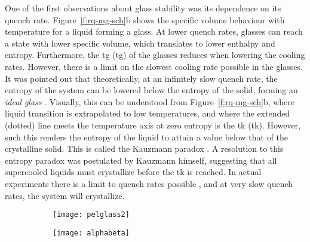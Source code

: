 One of the first observations about glass stability was its dependence on its quench rate. Figure~\ref{f:rq-mg-sch}b shows the specific volume behaviour with temperature for a liquid forming a glass. At lower quench rates, glasses can reach a state with lower specific volume, which translates to lower enthalpy and entropy. Furthermore, the \glsdesc{tg} (\gls{tg}) of the glasses reduces when lowering the cooling rates. However, there is a limit on the slowest cooling rate possible in the glasses. It was pointed out that theoretically, at an infinitely slow quench rate, the entropy of the system can be lowered below the entropy of the solid, forming an \textit{ideal glass} \cite{Kauzmann1948}. Visually, this can be understood from Figure~\ref{f:rq-mg-sch}b, where liquid transition is extrapolated to low temperatures, and where the extended (dotted) line meets the temperature axis at zero entropy is the \glsdesc{tk} (\gls{tk}). However, such this renders the entropy of the liquid to attain a value below that of the crystalline solid. This is called the Kauzmann paradox \cite{Kauzmann1948,Debenedetti2001,Berthier2016}. A resolution to this entropy paradox was postulated by Kauzmann himself, suggesting that all supercooled liquids must crystallize before the \gls{tk} is reached. In actual experiments there is a limit to quench rates possible \cite{Kauzmann1948}, and at very slow quench rates, the system will crystallize. \par

\begin{figure}[!h]
	\begin{subfigure}{0.5\textwidth}
		\texttt{[image: pelglass2]}
		\subcaption{}
	\end{subfigure}%
	\begin{subfigure}{0.5\textwidth}
		\texttt{[image: alphabeta]}
		\subcaption{}
	\end{subfigure}
	\label{f:mgpel}
\end{figure}

